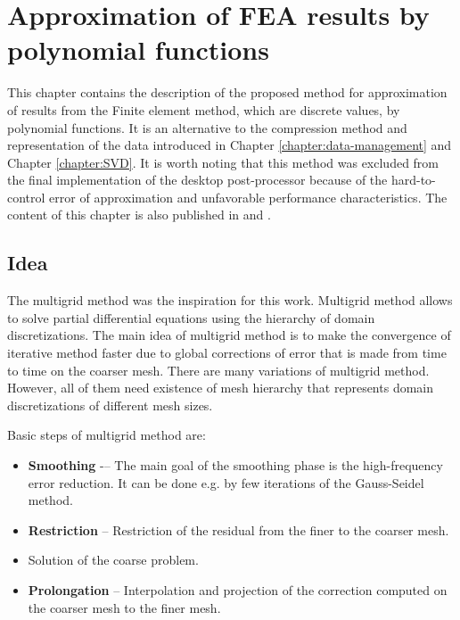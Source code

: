 \chapter{Approximation of FEA results by polynomial functions}
\label{chapter:approximation}


This chapter contains the description of the proposed method for approximation of results from the Finite element method, which are discrete values, by polynomial functions. It is an alternative to the compression method and representation of the data introduced in Chapter \ref{chapter:data-management} and Chapter \ref{chapter:SVD}. It is worth noting that this method was excluded from the final implementation of the desktop post-processor because of the hard-to-control error of approximation and unfavorable performance characteristics. The content of this chapter is also published in \cite{Benes2016} and \cite{Benes2016Pollack}.


\section{Idea}

The multigrid method \cite{Briggs2000,Shaidurov2013,Hackbusch2013} was the inspiration for this work. Multigrid method allows to solve partial differential equations using the hierarchy of domain discretizations. The main idea of multigrid method is to make the convergence of iterative method faster due to global corrections of error that is made from time to time on the coarser mesh. There are many variations of multigrid method. However, all of them need existence of mesh hierarchy that represents domain discretizations of different mesh sizes.

Basic steps of multigrid method are:

\begin{itemize}
    \item \textbf{Smoothing} -– The main goal of the smoothing phase is the high-frequency error reduction. It can be done e.g. by few iterations of the Gauss-Seidel method.
    \item \textbf{Restriction} -- Restriction of the residual from the finer to the coarser mesh.
    \item Solution of the coarse problem.
    \item \textbf{Prolongation} -- Interpolation and projection of the correction computed on the coarser mesh to the finer mesh.
\end{itemize}

